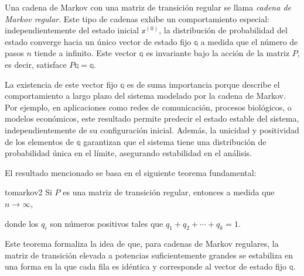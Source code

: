 Una cadena de Markov con una matriz de transición regular se llama \emph{cadena de Markov regular}. Este tipo de cadenas exhibe un comportamiento especial: independientemente del estado inicial $\mathbb{x}^{(0)}$, la distribución de probabilidad del estado converge hacia un único vector de estado fijo $\mathbb{q}$ a medida que el número de pasos $n$ tiende a infinito. Este vector $\mathbb{q}$ es invariante bajo la acción de la matriz $P$, es decir, satisface $P \mathbb{q} = \mathbb{q}$.

La existencia de este vector fijo $\mathbb{q}$ es de suma importancia porque describe el comportamiento a largo plazo del sistema modelado por la cadena de Markov. Por ejemplo, en aplicaciones como redes de comunicación, procesos biológicos, o modelos económicos, este resultado permite predecir el estado estable del sistema, independientemente de su configuración inicial. Además, la unicidad y positividad de los elementos de $\mathbb{q}$ garantizan que el sistema tiene una distribución de probabilidad única en el límite, asegurando estabilidad en el análisis.

El resultado mencionado se basa en el siguiente teorema fundamental:

\begin{theorem}{}{tomarkov2}
    Si $P$ es una matriz de transición regular, entonces a medida que $n \to \infty$,
    \begin{matrizn}
    \end{matrizn}
    donde los $q_i$ son números positivos tales que $q_1 + q_2 + \cdots + q_k = 1$.
\end{theorem}

Este teorema formaliza la idea de que, para cadenas de Markov regulares, la matriz de transición elevada a potencias suficientemente grandes se estabiliza en una forma en la que cada fila es idéntica y corresponde al vector de estado fijo $\mathbb{q}$.

\newpage

